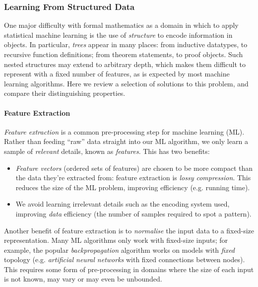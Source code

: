 


\subsubsection{Learning From Structured Data}

One major difficulty with formal mathematics as a domain in which to apply
statistical machine learning is the use of \emph{structure} to encode
information in objects. In particular, \emph{trees} appear in many places: from
inductive datatypes, to recursive function definitions; from theorem statements,
to proof objects. Such nested structures may extend to arbitrary depth, which
makes them difficult to represent with a fixed number of features, as is
expected by most machine learning algorithms. Here we review a selection of
solutions to this problem, and compare their distinguishing properties.

\paragraph{Feature Extraction}\label{sec:featureextraction}

\emph{Feature extraction} is a common pre-processing step for machine learning
(ML). Rather than feeding ``raw'' data straight into our ML algorithm, we only
learn a sample of \emph{relevant} details, known as \emph{features}. This has
two benefits:

\begin{itemize}
\item \emph{Feature vectors} (ordered sets of features) are chosen to be more
  compact than the data they're extracted from: feature extraction is
  \emph{lossy compression}. This reduces the size of the ML problem, improving
  efficiency (e.g. running time).
\item We avoid learning irrelevant details such as the encoding system used,
  improving \emph{data} efficiency (the number of samples required to spot a
  pattern).
\end{itemize}

Another benefit of feature extraction is to \emph{normalise} the input data to a
fixed-size representation. Many ML algorithms only work with fixed-size inputs;
for example, the popular \emph{backpropagation} \cite{Russell:2003:AIM:773294}
algorithm works on models with \emph{fixed} topology (e.g. \emph{artificial
  neural networks} with fixed connections between nodes). This requires some
form of pre-processing in domains where the size of each input is not known, may
vary or may even be unbounded.

